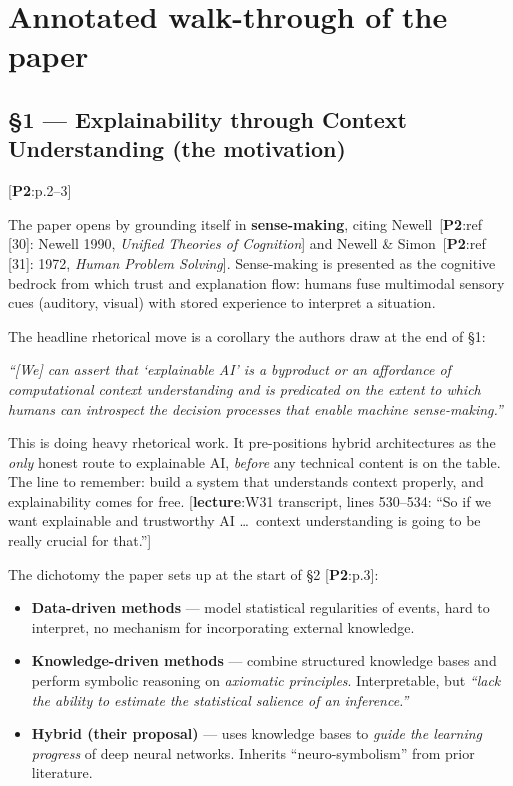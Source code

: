 \documentclass[11pt, a4paper]{article}
\newcommand{\paperref}[1]{\textcolor{srcBd}{\small[\textbf{P2}:#1]}}
\newcommand{\lectref}[1]{\textcolor{srcBd}{\small[\textbf{lecture}:#1]}}
\begin{document}
\section{Annotated walk-through of the paper}

\subsection{§1 — Explainability through Context Understanding (the motivation)}
\paperref{p.2--3}

The paper opens by grounding itself in \textbf{sense-making}, citing Newell~\paperref{ref [30]: Newell 1990, \emph{Unified Theories of Cognition}} and Newell \& Simon~\paperref{ref [31]: 1972, \emph{Human Problem Solving}}. Sense-making is presented as the cognitive bedrock from which trust and explanation flow: humans fuse multimodal sensory cues (auditory, visual) with stored experience to interpret a situation.

The headline rhetorical move is a corollary the authors draw at the end of §1:

\begin{exbox}[Quote (\paperref{end of §1, p.3})]
\emph{``[We] can assert that `explainable AI' is a byproduct or an affordance of computational context understanding and is predicated on the extent to which humans can introspect the decision processes that enable machine sense-making.''}
\end{exbox}

This is doing heavy rhetorical work. It pre-positions hybrid architectures as the \emph{only} honest route to explainable AI, \emph{before} any technical content is on the table. The line to remember: build a system that understands context properly, and explainability comes for free. \lectref{W31 transcript, lines 530--534: ``So if we want explainable and trustworthy AI \ldots\ context understanding is going to be really crucial for that.''}

The dichotomy the paper sets up at the start of §2 \paperref{p.3}:
\begin{itemize}
  \item \textbf{Data-driven methods} — model statistical regularities of events, hard to interpret, no mechanism for incorporating external knowledge.
  \item \textbf{Knowledge-driven methods} — combine structured knowledge bases and perform symbolic reasoning on \emph{axiomatic principles}. Interpretable, but \emph{``lack the ability to estimate the statistical salience of an inference.''}
  \item \textbf{Hybrid (their proposal)} — uses knowledge bases to \emph{guide the learning progress} of deep neural networks. Inherits ``neuro-symbolism'' from prior literature.
\end{itemize}
\end{document}
